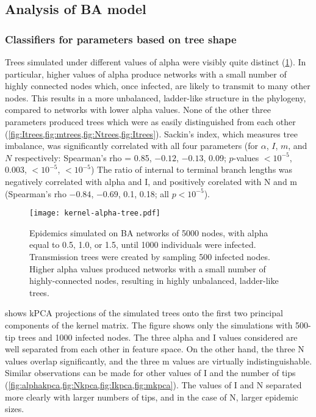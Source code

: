 \subsection{Analysis of \acrlong{BA} model}



\subsubsection*{Classifiers for parameters based on tree shape}



Trees simulated under different values of \gls{alpha} were visibly quite
distinct (\cref{fig:alphatrees}). In particular, higher values of \gls{alpha}
produce networks with a small number of highly connected nodes which, once
infected, are likely to transmit to many other nodes. This results in a more
unbalanced, ladder-like structure in the phylogeny, compared to networks with
lower \gls{alpha} values. None of the other three parameters produced trees
which were as easily distinguished from each other
(\cref{fig:Itrees,fig:mtrees,fig:Ntrees,fig:Itrees}).
Sackin's index, which measures tree imbalance, was significantly correlated with
all four parameters
    (for $\alpha$, $I$, $m$, and $N$ respectively: Spearman's rho =
     0.85,
     \ensuremath{-0.12},
     \ensuremath{-0.13},
     0.09;
     $p$-values
     ${<}10^{-5}$,
     $0.003$,
     ${<}10^{-5}$,
     ${<}10^{-5}$)
The ratio of internal to terminal branch lengths was negatively correlated with
\gls{alpha} and \gls{I}, and positively corelated with \gls{N} and \gls{m}
  (Spearman's rho
    \ensuremath{-0.84},
    \ensuremath{-0.69},
    0.1,
    0.18;
  all $p < 10^{-5}$).

\begin{figure}[ht]
  \centering
  \texttt{[image: kernel-alpha-tree.pdf]}
  \caption[Visibly distinctive trees simulated under three values of \gls{alpha}]{
    Epidemics simulated on \gls{BA} networks of 5000 nodes, with \gls{alpha}
    equal to 0.5, 1.0, or 1.5, until 1000 individuals were infected.
    Transmission trees were created by sampling 500 infected nodes. Higher
    \gls{alpha} values produced networks with a small number of
    highly-connected nodes, resulting in highly unbalanced, ladder-like trees.
  }
  \label{fig:alphatrees}
\end{figure}

 shows \gls{kPCA} projections of the simulated trees onto the
first two principal components of the kernel matrix. The figure shows only the
simulations with 500-tip trees and 1000 infected nodes. The three \gls{alpha}
and \gls{I} values considered are well separated from each other in feature
space. On the other hand, the three \gls{N} values overlap significantly, and
the three \gls{m} values are virtually indistinguishable. Similar observations
can be made for other values of \gls{I} and the number of tips
(\cref{fig:alphakpca,fig:Nkpca,fig:Ikpca,fig:mkpca}). The values of \gls{I} and
\gls{N} separated more clearly with larger numbers of tips, and in the case of
\gls{N}, larger epidemic sizes.

